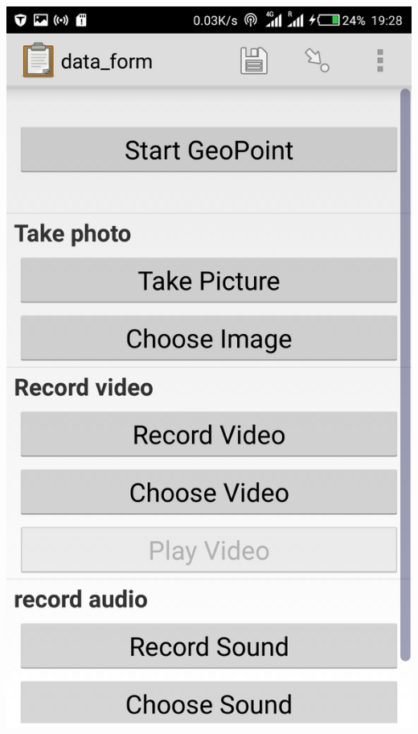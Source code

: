 \documentclass[12pt,letterpaper]{article}
\begin{document}
{					\includegraphics[scale=0.1]{paul3}
}
\end{document}
